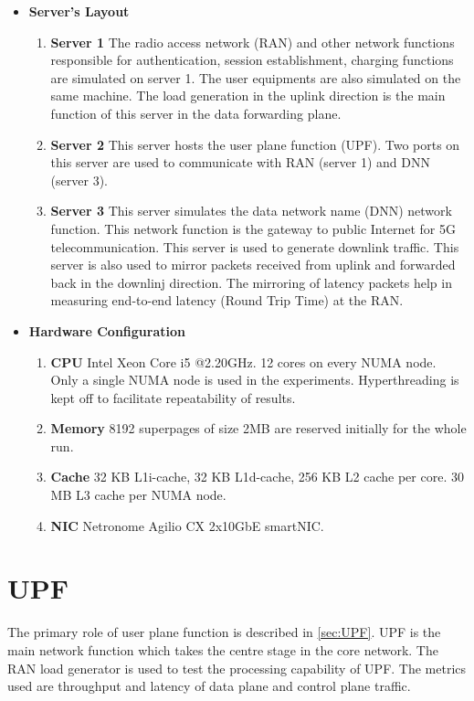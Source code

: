  \begin{itemize} 
        \item \textbf{Server's Layout}
        \begin{enumerate}
                \item \textbf{Server 1} The radio access network (RAN) and other network functions responsible for authentication,
         session establishment, charging functions are simulated on server 1.  The user equipments are also 
         simulated on the same machine. The load generation in the uplink direction is the main function of this server in the data forwarding plane.
                \item \textbf{Server 2} This server hosts the user plane function
		 (UPF). Two ports on this server are used to communicate with RAN 
         (server 1) and DNN (server 3).
                 \item \textbf{Server 3} This server simulates the data network name (DNN) network function. This network 
        function is the gateway to public Internet for 5G telecommunication. This server is used to generate downlink traffic. This server is also used to mirror packets received from uplink and forwarded back in the downlinj direction. The mirroring of latency packets help in measuring end-to-end latency (Round Trip Time) at the RAN. 
        \end{enumerate} 
        \item \textbf{Hardware Configuration} 
        \begin{enumerate}
                \item \textbf{CPU} Intel Xeon Core i5 @2.20GHz. 12 cores on every NUMA node. Only a single NUMA node is used in the experiments. Hyperthreading is kept off to facilitate repeatability of results.
                \item \textbf{Memory} 8192 superpages of size 2MB are reserved initially for the whole run.
                \item \textbf{Cache} 32 KB L1i-cache, 32 KB L1d-cache, 256 KB L2 cache per core. 30 MB L3 cache per NUMA node. 
                \item \textbf{NIC} Netronome Agilio CX 2x10GbE smartNIC.
	       \end{enumerate}
        
\end{itemize}

\section{UPF}
The primary role of user plane function is described in \ref{sec:UPF}. UPF is the main network function which takes the centre stage in the core network. The RAN load generator is used to test the processing capability of UPF. The metrics used are throughput and latency of data plane and control plane traffic. 

